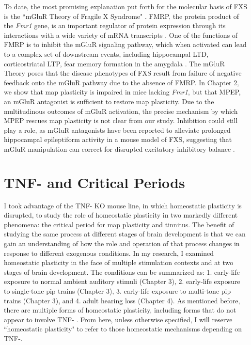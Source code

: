 To date, the most promising explanation put forth for the molecular basis of FXS is the ``mGluR Theory of Fragile X Syndrome" \cite{Bear2004}. FMRP, the protein product of the \textit{Fmr1} gene, is an important regulator of protein expression through its interactions with a wide variety of mRNA transcripts \cite{Brown2001}. One of the functions of FMRP is to inhibit the mGluR signaling pathway, which when activated can lead to a complex set of downstream events, including hippocampal LTD, corticostriatal LTP, fear memory formation in the amygdala \cite{Oliet1997, Gubellini2003, Rodrigues2002}. The mGluR Theory poses that the disease phenotypes of FXS result from failure of negative feedback onto the mGluR pathway due to the absence of FMRP. In Chapter 2, we show that map plasticity is impaired in mice lacking \textit{Fmr1}, but that MPEP, an mGluR antagonist is sufficient to restore map plasticity. Due to the multitudinous outcomes of mGluR activation, the precise mechanism by which MPEP rescues map plasticity is not clear from our study. Inhibition could still play a role, as mGluR antagonists have been reported to alleviate prolonged hippocampal epileptiform activity in a mouse model of FXS, suggesting that mGluR manipulation can correct for disrupted excitatory-inhibitory balance \cite{Chuang2005}.

\section{TNF-\textalpha{} and Critical Periods}

I took advantage of the TNF-\textalpha{} KO mouse line, in which homeostatic plasticity is disrupted, to study the role of homeostatic plasticity in two markedly different phenomena: the critical period for map plasticity and tinnitus.
The benefit of studying the same process at different stages of brain development is that we can gain an understanding of how the role and operation of that process changes in response to different exogenous conditions. In my research, I examined homeostatic plasticity in the face of multiple stimulation contexts and at two stages of brain development. The conditions can be summarized as: 1. early-life exposure to normal ambient auditory stimuli (Chapter 3), 2. early-life exposure to single-tone pip trains (Chapter 3), 3. early-life exposure to multi-tone pip trains (Chapter 3), and 4. adult hearing loss (Chapter 4). As mentioned before, there are multiple forms of homeostatic plasticity, including forms that do not appear to involve TNF-\textalpha{} \cite{Stellwagen2006}. From here, unless otherwise specified, I will reserve ``homeostatic plasticity" to refer to those homeostatic mechanisms depending on TNF-\textalpha{}.

